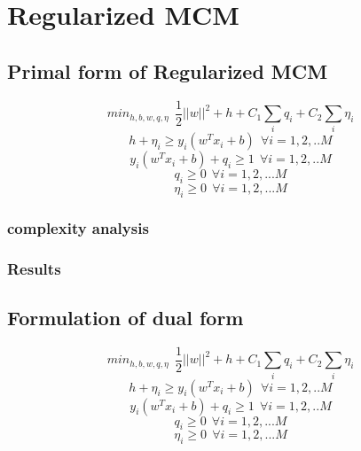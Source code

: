 \usepackage{bbm}
\chapter{Regularized MCM}

\section{Primal form of Regularized MCM}
\begin{equation}\label{mcmeq1}
min_{h,b,w,q,\eta}\:\: \frac{1}{2}||w||^2 + h + C_1\sum_i{q_i} + C_2\sum_i{\eta_i}
\end{equation}
\begin{equation}\label{mcmeq2}
h + \eta_i \geq y_i(w^Tx_i+b) \:\:\forall i={1, 2, .. M}
\end{equation}
\begin{equation}\label{mcmeq3}
y_i(w^Tx_i +b) + q_i \geq 1 \:\:\forall i={1,2,.. M}
\end{equation}
\begin{equation}\label{mcmeq4}
q_i \geq 0 \:\:\forall i={1, 2, ... M}
\end{equation}
\begin{equation}
\eta_i \geq 0 \:\:\forall i={1, 2, ... M}
\end{equation}

\subsection{complexity analysis}
\subsection{Results}


\section{Formulation of dual form}
\begin{equation}\label{mcmeq1}
min_{h,b,w,q,\eta}\:\: \frac{1}{2}||w||^2 + h + C_1\sum_i{q_i} + C_2\sum_i{\eta_i}
\end{equation}
\begin{equation}\label{mcmeq2}
h + \eta_i \geq y_i(w^Tx_i+b) \:\:\forall i={1, 2, .. M}
\end{equation}
\begin{equation}\label{mcmeq3}
y_i(w^Tx_i +b) + q_i \geq 1 \:\:\forall i={1,2,.. M}
\end{equation}
\begin{equation}\label{mcmeq4}
q_i \geq 0 \:\:\forall i={1, 2, ... M}
\end{equation}
\begin{equation}
\eta_i \geq 0 \:\:\forall i={1, 2, ... M}
\end{equation}

